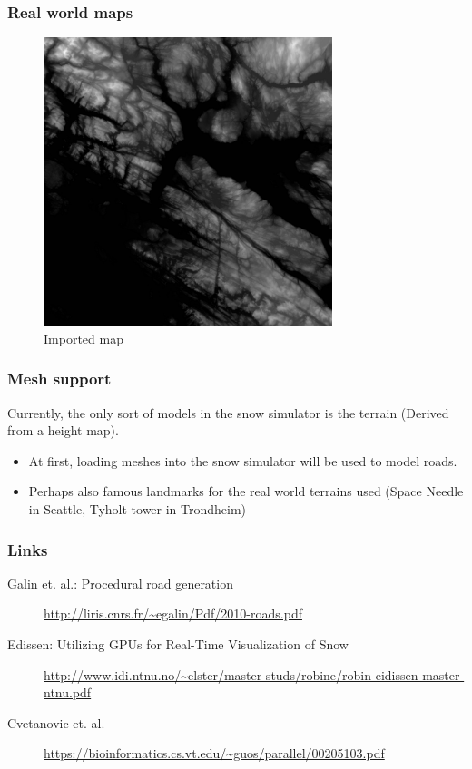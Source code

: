 \begin{frame}
\frametitle{Real world maps}
\begin{figure}[ht]
\includegraphics[width=0.75\textwidth]{gfx/converted_map}
\caption{Imported map}
\label{fig:trondheim}
\end{figure}
\end{frame}

\begin{frame}
\frametitle{Mesh support}
Currently, the only sort of models in the snow simulator is the terrain (Derived from a height map).
\begin{itemize}
\item At first, loading meshes into the snow simulator will be used to model roads.
\item Perhaps also famous landmarks for the real world terrains used (Space Needle in Seattle, Tyholt tower in Trondheim)
\end{itemize}
\end{frame}

\begin{frame}
\frametitle{Links}
\begin{description}
\item[Galin et. al.: Procedural road generation] \url{http://liris.cnrs.fr/~egalin/Pdf/2010-roads.pdf}
\item[Edissen: Utilizing GPUs for Real-Time Visualization of Snow] \url{http://www.idi.ntnu.no/\~elster/master-studs/robine/robin-eidissen-master-ntnu.pdf}
\item[Cvetanovic et. al.] \url{https://bioinformatics.cs.vt.edu/~guos/parallel/00205103.pdf}
\end{description}
\end{frame}
